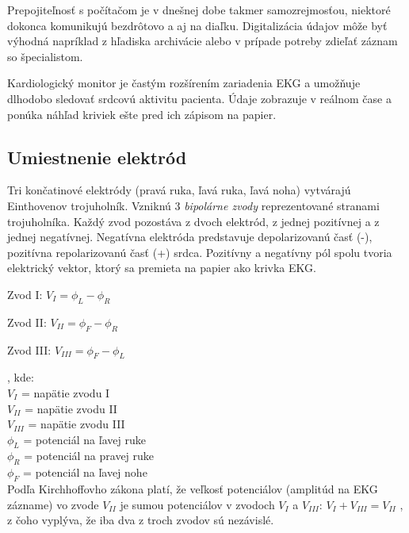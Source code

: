 \documentclass[titlepage,12pt]{article}
\begin{document}
Prepojiteľnosť s počítačom je v dnešnej dobe takmer samozrejmosťou, niektoré dokonca \linebreak komunikujú bezdrôtovo a aj na diaľku. Digitalizácia údajov môže byť výhodná napríklad z hľadiska archivácie alebo v prípade potreby zdieľať záznam so špecialistom.

Kardiologický monitor je častým rozšírením zariadenia EKG a umožňuje dlhodobo sledovať srdcovú aktivitu pacienta. Údaje zobrazuje v reálnom čase a ponúka náhľad kriviek ešte pred ich zápisom na papier.


\newpage

\subsection{Umiestnenie elektród}
Tri končatinové elektródy (pravá ruka, ľavá ruka, ľavá noha)  vytvárajú Einthovenov \linebreak trojuholník. Vzniknú 3 \emph{bipolárne zvody} reprezentované stranami trojuholníka. Každý zvod pozostáva  z dvoch elektród, z jednej pozitívnej a z jednej negatívnej. Negatívna elektróda predstavuje depolarizovanú časť (-), pozitívna repolarizovanú časť (+) srdca. Pozitívny a negatívny pól spolu tvoria elektrický vektor, ktorý sa premieta na papier ako krivka EKG.

\begin{description}
	\item Zvod I: \tabto{1cm} $V_{I} = \phi_L - \phi_R$
	\item Zvod II: \tabto{1cm} $V_{II} = \phi_F - \phi_R$
	\item Zvod III:	\tabto{1cm} $V_{III} = \phi_F - \phi_L$
\end{description}
, kde: \\
\tabto{1cm} $V_{I}$ = napätie zvodu I\\
\tabto{1cm} $V_{II}$ = napätie zvodu II\\
\tabto{1cm} $V_{III}$ = napätie zvodu III\\
\tabto{1cm} $\phi_L$ = potenciál na ľavej ruke\\
\tabto{1cm} $\phi_R$ = potenciál na pravej ruke\\
\tabto{1cm} $\phi_F$ = potenciál na ľavej nohe\\

Podľa Kirchhoffovho zákona platí, že veľkosť potenciálov (amplitúd na EKG zázname) vo zvode $V_{II}$ je sumou potenciálov v zvodoch $V_{I}$ a  $V_{III}$:
\tabto{1cm} $V_{I} + V_{III} = V_{II}$
, z čoho vyplýva, že iba dva z troch zvodov sú nezávislé.
\\
\end{document}
